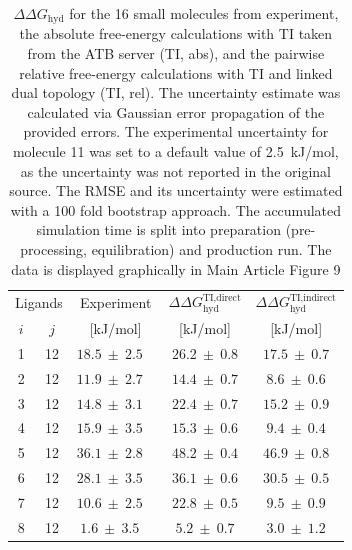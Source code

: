 \begin{table}[H]
\caption{$\Delta \Delta G_\text{hyd}$ for the 16 small molecules from experiment, the absolute free-energy calculations with TI taken from the ATB server\cite{Stroet2018} (TI, abs), and the pairwise relative free-energy calculations with TI and linked dual topology (TI, rel).
The uncertainty estimate was calculated via Gaussian error propagation of the provided errors. The experimental uncertainty for molecule 11 was set to a default value of 2.5~kJ/mol\cite{Mobley2014}, as the uncertainty was not reported in the original source\cite{Wolfenden1987}. The RMSE and its uncertainty were estimated with a 100 fold bootstrap approach. The accumulated simulation time is split into preparation (pre-processing, equilibration) and production run. The data is displayed graphically in Main Article Figure 9}
\begin{center}
\begin{adjustbox}{max width=\textwidth}
\begin{tabular}{ | c c |c |c|c|}
\hline
  \multicolumn{2}{|c|}{Ligands} & \multicolumn{1}{c|}{Experiment} &\multicolumn{1}{c|}{$\Delta\Delta G_\text{hyd}^\text{TI,direct}$}&\multicolumn{1}{c|}{$\Delta\Delta G_\text{hyd}^\text{TI,indirect}$}\\ 
    $i$ & $j$ & [kJ/mol] & [kJ/mol] & [kJ/mol]  \\
  \hline \hline
        1 &  12 &  $18.5 ~\pm~ 2.5$ ~\cite{Guthrie2014,Rizzo2006}&  $26.2 ~\pm~ 0.8$ &  $  17.5 ~\pm~ 0.7$\\
        2 &  12 &  $11.9 ~\pm~ 2.7$  ~\cite{Guthrie2014,Rizzo2006}  &  $14.4 ~\pm~ 0.7$ &  $  8.6 ~\pm~ 0.6 $\\
        3 &  12 &  $14.8 ~\pm~ 3.1$  ~\cite{Guthrie2014,Rizzo2006}  &  $22.4 ~\pm~ 0.7$ &  $ 15.2 ~\pm~ 0.9 $\\
        4 &  12 &  $15.9 ~\pm~ 3.5$  ~\cite{Rizzo2006} &  $15.3 ~\pm~ 0.6$ &  $  9.4 ~\pm~ 0.4 $\\
        5 &  12 &   $36.1 ~\pm~ 2.8$  ~\cite{Guthrie2014,Rizzo2006}  &  $48.2 ~\pm~ 0.4$ &  $ 46.9 ~\pm~ 0.8 $\\
        6 &  12 &   $28.1 ~\pm~ 3.5$  ~\cite{Rizzo2006}  &  $36.1 ~\pm~ 0.6$ & $  30.5 ~\pm~ 0.5 $\\
        7 &  12 &   $10.6 ~\pm~ 2.5$  ~\cite{Guthrie2009,Rizzo2006} &  $22.8 ~\pm~ 0.5$ &  $  9.5 ~\pm~ 0.9 $\\
        8 &  12 &   $ 1.6 ~\pm~ 3.5$  ~\cite{Mobley2014,Rizzo2006} &  $ 5.2 ~\pm~ 0.7$ &  $ 3.0 ~\pm~ 1.2 $\\

\end{tabular}
\end{adjustbox}
\end{center}
\end{table}
